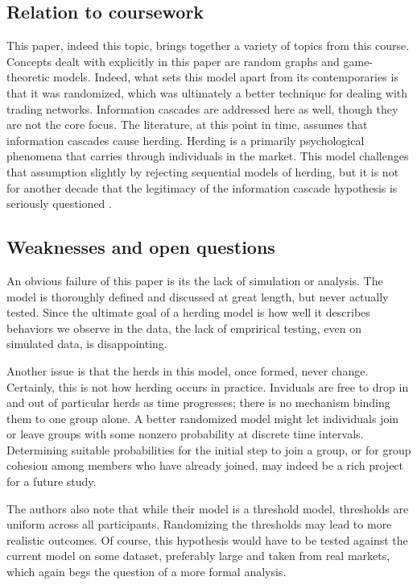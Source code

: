 \documentclass{article}
\begin{document}
\subsection{Relation to coursework}
This paper, indeed this topic, brings together a variety of topics from this course. 
Concepts dealt with explicitly in this paper are random graphs and game-theoretic models.
Indeed, what sets this model apart from its contemporaries is that it was randomized, which was ultimately a better technique for dealing with trading networks.
Information cascades are addressed here as well, though they are not the core focus.
The literature, at this point in time, assumes that information cascades cause herding.
Herding is a primarily psychological phenomena that carries through individuals in the market.
This model challenges that assumption slightly by rejecting sequential models of herding, but it is not for another decade that the legitimacy of the information cascade hypothesis is seriously questioned \cite{lin}.

\subsection{Weaknesses and open questions}
An obvious failure of this paper is its the lack of simulation or analysis.
The model is thoroughly defined and discussed at great length, but never actually tested. 
Since the ultimate goal of a herding model is how well it describes behaviors we observe in the data, the lack of emprirical testing, even on simulated data, is disappointing.

Another issue is that the herds in this model, once formed, never change. 
Certainly, this is not how herding occurs in practice. 
Inviduals are free to drop in and out of particular herds as time progresses; there is no mechanism binding them to one group alone.
A better randomized model might let individuals join or leave groups with some nonzero probability at discrete time intervals.
Determining suitable probabilities for the initial step to join a group, or for group cohesion among members who have already joined, may indeed be a rich project for a future study.

The authors also note that while their model is a threshold model, thresholds are uniform across all participants. 
Randomizing the thresholds may lead to more realistic outcomes. 
Of course, this hypothesis would have to be tested against the current model on some dataset, preferably large and taken from real markets, which again begs the question of a more formal analysis.
\end{document}
